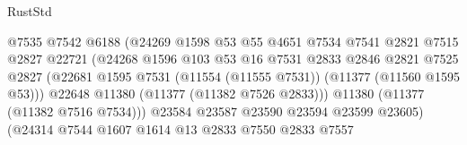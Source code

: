 \begin{lexlean}{RustStd}
\begin{coremodule}
                                          @7535
                                          @7542
                                          @6188
                                          (@24269
                                            @1598
                                            @53
                                            @55
                                            @4651
                                            @7534
                                            @7541
                                            @2821
                                            @7515
                                            @2827
                                            @22721
                                            (@24268
                                              @1596
                                              @103
                                              @53
                                              @16
                                              @7531
                                              @2833
                                              @2846
                                              @2821
                                              @7525
                                              @2827
                                              (@22681
                                                @1595
                                                @7531
                                                (@11554 (@11555 @7531))
                                                (@11377 (@11560 @1595 @53)))
                                              @22648
                                              @11380
                                              (@11377 (@11382 @7526 @2833)))
                                            @11380
                                            (@11377 (@11382 @7516 @7534)))
                                          @23584
                                          @23587
                                          @23590
                                          @23594
                                          @23599
                                          @23605)
                                        (@24314
                                          @7544
                                          @1607
                                          @1614
                                          @13
                                          @2833
                                          @7550
                                          @2833
                                          @7557

\end{coremodule}
\end{lexlean}
